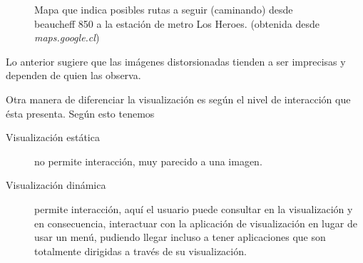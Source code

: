 \documentclass[12pt]{article}
\begin{document}
\begin{description}
\begin{figure}[h] %
\caption[Mapa de GoogleMaps]{Mapa que indica posibles rutas a seguir (caminando) desde beaucheff 850 a la estación de metro Los Heroes. (obtenida desde \textit{maps.google.cl})}
\label{fig:google_map}
\end{figure}

Lo anterior sugiere que las imágenes distorsionadas tienden a ser imprecisas y dependen de quien las observa. 

\end{description}	 

Otra manera de diferenciar la visualización es según el nivel de interacción que ésta presenta. Según esto tenemos

\begin{description}
	\item[Visualización estática] no permite interacción, muy parecido a una imagen.
	\item[Visualización dinámica] permite interacción, aquí el usuario puede consultar en la visualización y en consecuencia, interactuar con la aplicación de visualización en lugar de usar un menú, pudiendo llegar incluso a tener aplicaciones que son totalmente dirigidas a través de su visualización.
\end{description}


\end{document}
